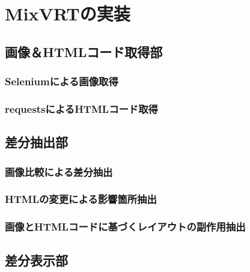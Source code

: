 \chapter{MixVRTの実装}\label{cha:Implementation}



\section{画像＆HTMLコード取得部}\label{sec:area_detection_part}

\subsection{Seleniumによる画像取得}\label{subsec:rect_detection}

\subsection{requestsによるHTMLコード取得}\label{subsec:underline_detection}


\section{差分抽出部}\label{sec:OCR_part}

\subsection{画像比較による差分抽出}\label{subsec:char_extraction}

\subsection{HTMLの変更による影響箇所抽出}\label{subsec:bbox_coords_obtainment}

\subsection{画像とHTMLコードに基づくレイアウトの副作用抽出}\label{subsec:bbox_obtainment}


\section{差分表示部}\label{sec:label_link_part}